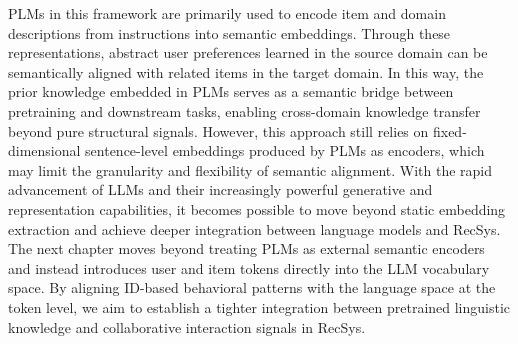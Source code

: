 PLMs in this framework are primarily used to encode item and domain descriptions from instructions into semantic embeddings. Through these representations, abstract user preferences learned in the source domain can be semantically aligned with related items in the target domain. In this way, the prior knowledge embedded in PLMs serves as a semantic bridge between pretraining and downstream tasks, enabling cross-domain knowledge transfer beyond pure structural signals. However, this approach still relies on fixed-dimensional sentence-level embeddings produced by PLMs as encoders, which may limit the granularity and flexibility of semantic alignment. With the rapid advancement of LLMs and their increasingly powerful generative and representation capabilities, it becomes possible to move beyond static embedding extraction and achieve deeper integration between language models and RecSys. The next chapter moves beyond treating PLMs as external semantic encoders and instead introduces user and item tokens directly into the LLM vocabulary space. By aligning ID-based behavioral patterns with the language space at the token level, we aim to establish a tighter integration between pretrained linguistic knowledge and collaborative interaction signals in RecSys.
